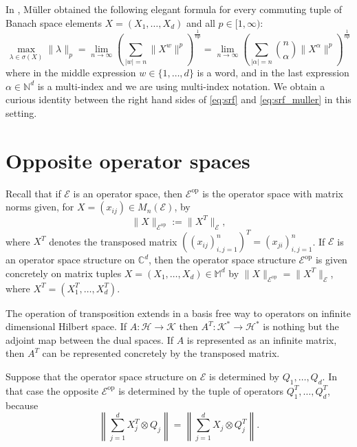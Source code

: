\documentclass[12pt]{amsart}
\numberwithin{equation}{section}
\theoremstyle{definition}
\newcommand{\cE}{\mathcal{E}}
\newcommand{\cH}{\mathcal{H}}
\newcommand{\cK}{\mathcal{K}}
\newcommand{\bC}{\mathbb{C}}
\newcommand{\bM}{\mathbb{M}}
\newcommand{\bN}{\mathbb{N}}
\DeclareMathOperator{\op}{op}
\begin{document}
In \cite{muller1997joint}, M\"{uller} obtained the following elegant formula for every commuting tuple of Banach space elements $X = (X_1, \ldots, X_d)$ and all $p \in [1, \infty)$: 
\begin{equation}\label{eq:srf_muller}
\max_{\lambda \in \sigma(X)}\|\lambda\|_p  = \lim_{n \to \infty} \left(\sum_{|w|=n} \|X^w\|^p \right)^{\frac{1}{np}}
= \lim_{n \to \infty} \left(\sum_{|\alpha|=n} \binom{n}{\alpha}\|X^\alpha\|^p \right)^{\frac{1}{np}}
\end{equation}
where in the middle expression $w \in \{1, \ldots, d\}$ is a word, and in the last expression $\alpha \in \bN^d$ is a multi-index and we are using multi-index notation. 
We obtain a curious identity between the right hand sides of \eqref{eq:srf} and \eqref{eq:srf_muller} in this setting. 





\section{Opposite operator spaces} 

Recall that if $\cE$ is an operator space, then $\cE^{\op}$ is the operator space with matrix norms given, for $X = (x_{ij}) \in M_n(\cE)$, by 
\[
\|X\|_{\cE^{\op}} := \|X^T\|_{\cE}, 
\]
where $X^T$ denotes the transposed matrix $\left((x_{ij})_{i,j=1}^n \right)^T = (x_{ji})_{i,j=1}^n$. 
If $\cE$ is an operator space structure on $\bC^d$, then the operator space structure $\cE^{\op}$ is given concretely on matrix tuples $X = (X_1, \ldots, X_d) \in \bM^d$ by $\|X\|_{\cE^{\op}} = \|X^T\|_\cE$, where $X^T = (X_1^T, \ldots, X_d^T)$. 

The operation of transposition extends in a basis free way to operators on infinite dimensional Hilbert space. 
If $A \colon \cH \to \cK$ then $A^T \colon \cK^* \to \cH^*$ is nothing but the adjoint map between the dual spaces. 
If $A$ is represented as an infinite matrix, then $A^T$ can be represented concretely by the transposed matrix. 

Suppose that the operator space structure on $\cE$ is determined by $Q_1, \ldots, Q_d$. 
In that case the opposite $\cE^{\op}$ is determined by the tuple of operators $Q_1^T, \ldots, Q_d^T$, because 
\[
\left\| \sum_{j=1}^d X_j^T \otimes Q_j \right\| = \left\| \sum_{j=1}^d X_j \otimes Q_j^T \right\|.
\]
\end{document}
